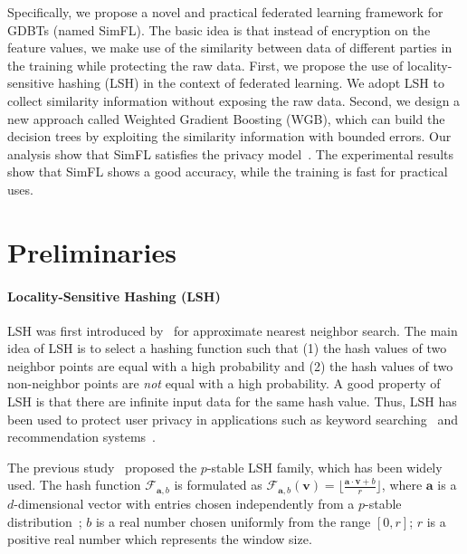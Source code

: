 \documentclass[letterpaper]{article} %
\theoremstyle{definition}
\newcommand{\citet}[1]{\citeauthor{#1} \shortcite{#1}}
\begin{document}
Specifically, we propose a novel and practical federated learning framework for GDBTs (named SimFL). The basic idea is that instead of encryption on the feature values, we make use of the similarity between data of different parties in the training while protecting the raw data. First, we propose the use of locality-sensitive hashing (LSH) in the context of federated learning. We adopt LSH to collect similarity information without exposing the raw data.  Second, we design a new approach called Weighted Gradient Boosting (WGB), which can build the decision trees by exploiting the similarity information with bounded errors. Our analysis show that SimFL satisfies the privacy model~\cite{du2004privacy,liu2018secure}. The experimental results show that SimFL shows a good accuracy, while the training is fast for practical uses.

\section{Preliminaries}

\paragraph{Locality-Sensitive Hashing (LSH)}
LSH was first introduced by~\citet{gionis1999similarity} for approximate nearest neighbor search. The main idea of LSH is to select a hashing function such that (1) the hash values of two neighbor points are equal with a high probability and (2) the hash values of two non-neighbor points are \emph{not} equal with a high probability. A good property of LSH is that there are infinite input data for the same hash value. Thus, LSH has been used to protect user privacy in applications such as keyword searching~\cite{wang2014privacy} and recommendation systems~\cite{qi2017distributed}.

The previous study~\cite{datar2004locality} proposed the $p$-stable LSH family, which has been widely used. The hash function $\mathcal{F}_{\mathbf{a},b}$ is formulated as $\mathcal{F}_{\mathbf{a},b}(\mathbf{v})=\lfloor\frac{\mathbf{a}\cdot\mathbf{v}+b}{r}\rfloor$, where $\mathbf{a}$ is a $d$-dimensional vector with entries chosen independently from a $p$-stable distribution~\cite{zolotarev1986one}; $b$ is a real number chosen uniformly from the range $[0,r]$; $r$ is a positive real number which represents the window size.
\end{document}

